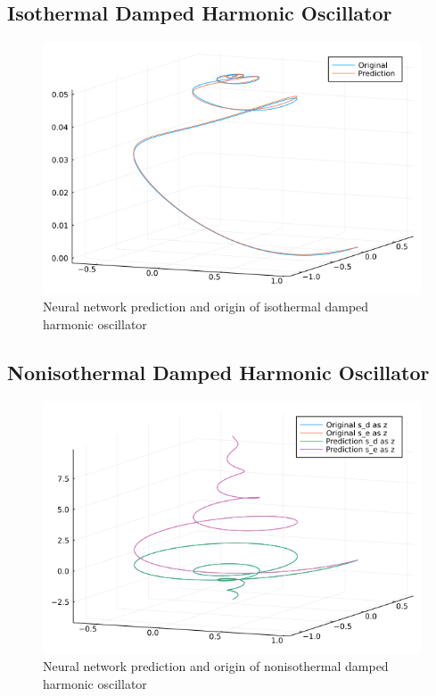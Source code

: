 \clearpage
\subsection{Isothermal Damped Harmonic Oscillator}

\begin{figure}[h!]
    \centering
    \includegraphics[scale=0.5]{figures/2_Neural_ODE/2_idho_ODE_result.png}
    \caption{Neural network prediction and origin of isothermal damped harmonic oscillator}
    \label{fig:NN_ODE_idho}
\end{figure}


\clearpage
\subsection{Nonisothermal Damped Harmonic Oscillator}

\begin{figure}[h!]
    \centering
    \includegraphics[scale=0.5]{figures/2_Neural_ODE/3_ndho_ODE_result.png}
    \caption{Neural network prediction and origin of nonisothermal damped harmonic oscillator}
    \label{fig:NN_ODE_ndho}
\end{figure}


